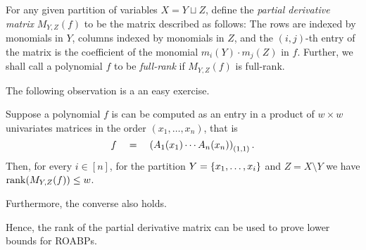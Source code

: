 \begin{definition} \label{defn:pdm-commutative}
For any given partition of variables $X = Y \sqcup Z$, define the \emph{partial derivative matrix} $M_{Y,Z}(f)$ to be the matrix described as follows: The rows are indexed by monomials in $Y$, columns indexed by monomials in $Z$, and the $(i,j)$-th entry of the matrix is the coefficient of the monomial $m_i(Y)\cdot m_j(Z)$ in $f$.
Further, we shall call a polynomial $f$ to be \emph{full-rank} if $M_{Y,Z}(f)$ is full-rank.
\end{definition}


\medskip

\noindent
The following observation is a an easy exercise. 

\begin{lemma}
Suppose a polynomial $f$ is can be computed as an entry in a product of $w\times w$ univariates matrices in the order $(x_1,\ldots, x_n)$, that is
\[
f \quad = \quad \left(A_1(x_1) \cdots A_n(x_n) \right)_{(1,1)}.
\]
Then, for every $i \in [n]$, for the partition $Y = \left\{x_1, \ldots , x_{i}\right\}$ and $Z = X \setminus Y$ we have $\operatorname{rank}(M_{Y,Z}(f)) \leq w$. 

Furthermore, the converse also holds. 
\end{lemma}

Hence, the rank of the partial derivative matrix can be used to prove lower bounds for ROABPs. \\

